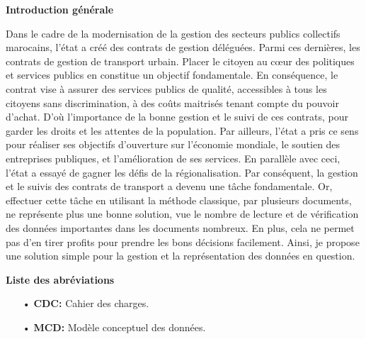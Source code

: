 \documentclass[a4paper]{report}
\begin{document}
\cleardoublepage
\renewcommand{\listtablename}{Table des tableaux}
\listoftables

\newpage
\begin{doublespace}
	\begin{center}
		\vspace*{1cm}
		\textbf{\huge{Introduction générale}}
	\end{center}
	\renewcommand{\headrulewidth}{1pt}
	\fancyhead[L]{\hspace*{5cm}}

	Dans le cadre de la modernisation de la gestion des secteurs publics
	collectifs
	marocains, l’état a créé des contrats de gestion déléguées. Parmi ces
	dernières, les
	contrats de gestion de transport urbain. Placer le citoyen au cœur des
	politiques et
	services publics en constitue un objectif fondamentale. En conséquence, le
	contrat
	vise à assurer des services publics de qualité, accessibles à tous les
	citoyens sans discrimination, à des coûts maitrisés tenant compte du
	pouvoir
	d’achat. D'où  l'importance de la bonne gestion et le suivi de ces
	contrats, pour garder
	les droits et les attentes de la population.
	Par ailleurs, l’état a pris ce sens pour réaliser ses objectifs d’ouverture
	sur l’économie
	mondiale, le soutien des entreprises publiques, et l’amélioration de ses
	services.
	En parallèle avec ceci, l’état a essayé de gagner les défis de la
	régionalisation.
	Par conséquent, la gestion et le suivis des contrats de transport a devenu
	une tâche
	fondamentale. Or, effectuer cette tâche en utilisant la méthode classique,
	par plusieurs documents,
	ne représente plus une bonne solution, vue le nombre de lecture et de
	vérification
	des données importantes dans les documents nombreux. En plus, cela ne
	permet pas d’en
	tirer profits pour prendre les bons décisions facilement. Ainsi, je propose
	une
	solution simple pour la gestion et la représentation des données en
	question.

	\clearpage
	\begin{center}
		\vspace*{1cm}
		\textbf{\huge{Liste des abréviations}}
	\end{center}
	\renewcommand{\headrulewidth}{1pt}
	\fancyhead[L]{\hspace*{5cm}}
	\begin{itemize}
		\item[•] \textbf{CDC:} Cahier des charges.
		\item[•] \textbf{MCD:} Modèle conceptuel des données.
	\end{itemize}


\end{doublespace}
\end{document}
